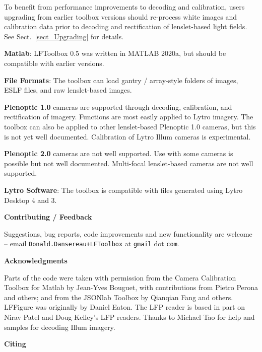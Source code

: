 \documentclass[onecolumn]{article}
\newcommand{\SymbolText}[1]{\texttt{\small #1}}
\begin{document}
To benefit from performance improvements to decoding and calibration, users upgrading from earlier toolbox versions should re-process white images and calibration data prior to decoding and rectification of lenslet-based light fields.  See Sect.~\ref{sect_Upgrading} for details.

\textbf{Matlab}: LFToolbox 0.5 was written in MATLAB 2020a, but should be compatible with earlier versions.

\textbf{File Formats}: The toolbox can load gantry / array-style folders of images, ESLF files, and raw lenslet-based images.

\textbf{Plenoptic 1.0} cameras are supported through decoding, calibration, and rectification of imagery. Functions are most easily applied to Lytro imagery. The toolbox can also be applied to other lenslet-based Plenoptic 1.0 cameras, but this is not yet well documented. Calibration of Lytro Illum cameras is experimental.

\textbf{Plenoptic 2.0} cameras are not well supported. Use with some cameras is possible but not well documented. Multi-focal lenslet-based cameras are not well supported.

\textbf{Lytro Software}: The toolbox is compatible with files generated using Lytro Desktop 4 and 3.

\vspace{1em}\noindent\textbf{\large{Contributing / Feedback}}\vspace{0.5em}

Suggestions, bug reports, code improvements and new functionality are welcome -- email \SymbolText{Donald.Dansereau+LFToolbox} \small{at} \SymbolText{gmail} \small{dot} \SymbolText{com}.

\vspace{1em}\noindent\textbf{\large{Acknowledgments}}\vspace{0.5em}

Parts of the code were taken with permission from the Camera Calibration Toolbox for Matlab by Jean-Yves Bouguet, with contributions from Pietro Perona and others; and from the JSONlab Toolbox by Qianqian Fang and others. LFFigure was originally by Daniel Eaton. The LFP reader is based in part on Nirav Patel and Doug Kelley's LFP readers. Thanks to Michael Tao for help and samples for decoding Illum imagery.

\vspace{1em}\noindent\textbf{\large{Citing}}\vspace{0.5em}
\end{document}
